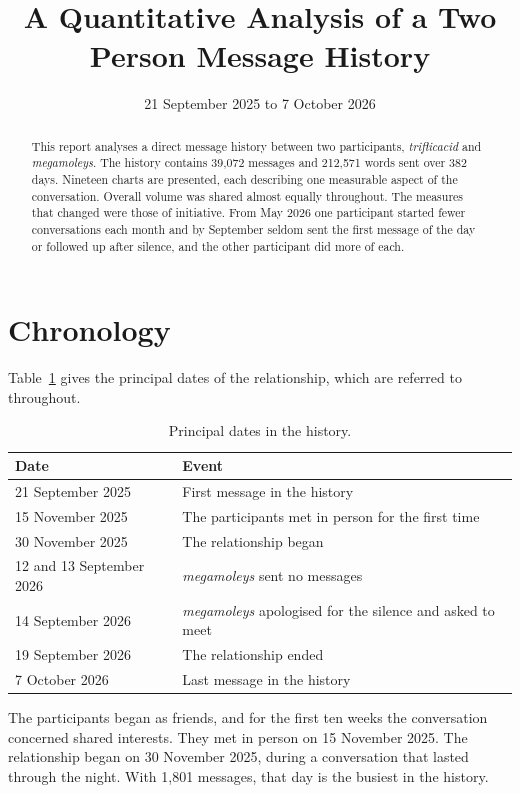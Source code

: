 \documentclass[11pt,a4paper]{article}
\title{A Quantitative Analysis of a Two Person Message History}
\author{}
\date{21 September 2025 to 7 October 2026}
\newcommand{\userA}{\textit{triflicacid}}
\newcommand{\userB}{\textit{megamoleys}}
\begin{document}
\maketitle

\begin{abstract}
This report analyses a direct message history between two participants, \userA{} and \userB{}.
The history contains 39,072 messages and 212,571
words sent over 382 days. Nineteen charts are presented, each describing one measurable
aspect of the conversation. Overall volume was shared almost equally throughout. The
measures that changed were those of initiative. From May 2026 one participant started
fewer conversations each month and by September seldom sent the first message of the
day or followed up after silence, and the other participant did more of each.
\end{abstract}

\tableofcontents

\section{Chronology}

Table~\ref{tab:chronology} gives the principal dates of the relationship, which are
referred to throughout.

\begin{table}[H]
  \centering
  \small
  \begin{tabular}{ll}
    \toprule
    Date & Event \\
    \midrule
    21 September 2025 & First message in the history \\
    15 November 2025 & The participants met in person for the first time \\
    30 November 2025 & The relationship began \\
    12 and 13 September 2026 & \userB{} sent no messages \\
    14 September 2026 & \userB{} apologised for the silence and asked to meet \\
    19 September 2026 & The relationship ended \\
    7 October 2026 & Last message in the history \\
    \bottomrule
  \end{tabular}
  \caption{Principal dates in the history.}
  \label{tab:chronology}
\end{table}

The participants began as friends, and for the first ten weeks the conversation
concerned shared interests. They met in person on 15 November 2025. The relationship
began on 30 November 2025, during a conversation that lasted through the night. With
1,801 messages, that day is the busiest in the history.
\end{document}
